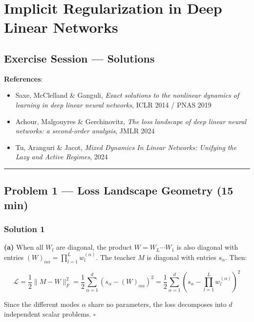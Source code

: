 \documentclass[
]{article}
\author{}
\date{}
\providecommand{\tightlist}{%
  \setlength{\itemsep}{0pt}\setlength{\parskip}{0pt}}
\begin{document}
\section{Implicit Regularization in Deep Linear
Networks}\label{implicit-regularization-in-deep-linear-networks}

\subsection{Exercise Session ---
Solutions}\label{exercise-session-solutions}

\textbf{References}:

\begin{itemize}
\tightlist
\item
  Saxe, McClelland \& Ganguli, \emph{Exact solutions to the nonlinear
  dynamics of learning in deep linear neural networks}, ICLR 2014 / PNAS
  2019
\item
  Achour, Malgouyres \& Gerchinovitz, \emph{The loss landscape of deep
  linear neural networks: a second-order analysis}, JMLR 2024
\item
  Tu, Aranguri \& Jacot, \emph{Mixed Dynamics In Linear Networks:
  Unifying the Lazy and Active Regimes}, 2024
\end{itemize}

\begin{center}\rule{0.5\linewidth}{0.5pt}\end{center}

\subsection{Problem 1 --- Loss Landscape Geometry (15
min)}\label{problem-1-loss-landscape-geometry-15-min}

\subsubsection{Solution 1}\label{solution-1}

\textbf{(a)} When all \(W_l\) are diagonal, the product
\(W = W_L \cdots W_1\) is also diagonal with entries
\((W)_{\alpha\alpha} = \prod_{l=1}^L w_l^{(\alpha)}\). The teacher \(M\)
is diagonal with entries \(s_\alpha\). Then:

\[\mathcal{L} = \frac{1}{2}\|M - W\|_F^2 = \frac{1}{2}\sum_{\alpha=1}^d (s_\alpha - (W)_{\alpha\alpha})^2 = \frac{1}{2}\sum_{\alpha=1}^d \left(s_\alpha - \prod_{l=1}^L w_l^{(\alpha)}\right)^2\]

Since the different modes \(\alpha\) share no parameters, the loss
decomposes into \(d\) independent scalar problems. \(\square\)
\end{document}

